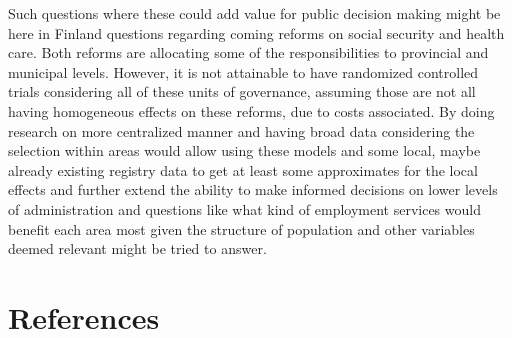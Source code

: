\documentclass[main=english,12pt,a4paper,pdftex,econ,utf8]{aaltothesis}
\begin{document}
Such questions where these could add value for public decision making might be here in Finland questions regarding coming reforms on social security and health care. Both reforms are allocating some of the responsibilities to provincial and municipal levels. However, it is not attainable to have randomized controlled trials considering all of these units of governance, assuming those are not all having homogeneous effects on these reforms, due to costs associated. By doing research on more centralized manner and having broad data considering the selection within areas would allow using these models and some local, maybe already existing registry data to get at least some approximates for the local effects and further extend the ability to make informed decisions on lower levels of administration and questions like what kind of employment services would benefit each area most given the structure of population and other variables deemed relevant might be tried to answer.

\clearpage

\section*{References}
\printbibliography[
    heading=subbibintoc,
    type=article,
    title={Articles \& seminar papers}
]
\printbibliography[
    heading=subbibintoc,
    type=book,
    title={Books}
]
\printbibliography[
    heading=subbibintoc,
    type=misc,
    title={Other sources}
]

\clearpage
\end{document}
